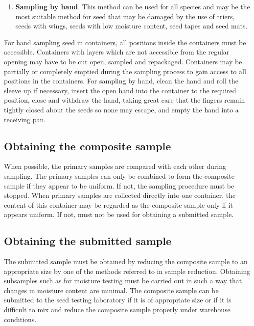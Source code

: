 \documentclass[]{book}
\providecommand{\tightlist}{%
  \setlength{\itemsep}{0pt}\setlength{\parskip}{0pt}}
\begin{document}
\begin{enumerate}
\def\labelenumi{\alph{enumi}.}
\setcounter{enumi}{3}
\tightlist
\item
  \textbf{Sampling by hand}. This method can be used for all species and
  may be the most suitable method for seed that may be damaged by the
  use of triers, seeds with wings, seeds with low moisture content, seed
  tapes and seed mats.
\end{enumerate}

For hand sampling seed in containers, all positions inside the
containers must be accessible. Containers with layers which are not
accessible from the regular opening may have to be cut open, sampled and
repackaged. Containers may be partially or completely emptied during the
sampling process to gain access to all positions in the containers. For
sampling by hand, clean the hand and roll the sleeve up if necessary,
insert the open hand into the container to the required position, close
and withdraw the hand, taking great care that the fingers remain tightly
closed about the seeds so none may escape, and empty the hand into a
receiving pan.

\subsection{Obtaining the composite
sample}\label{obtaining-the-composite-sample}

When possible, the primary samples are compared with each other during
sampling. The primary samples can only be combined to form the composite
sample if they appear to be uniform. If not, the sampling procedure must
be stopped. When primary samples are collected directly into one
container, the content of this container may be regarded as the
composite sample only if it appears uniform. If not, must not be used
for obtaining a submitted sample.

\subsection{Obtaining the submitted
sample}\label{obtaining-the-submitted-sample}

The submitted sample must be obtained by reducing the composite sample
to an appropriate size by one of the methods referred to in sample
reduction. Obtaining subsamples such as for moisture testing must be
carried out in such a way that changes in moisture content are minimal.
The composite sample can be submitted to the seed testing laboratory if
it is of appropriate size or if it is difficult to mix and reduce the
composite sample properly under warehouse conditions.
\end{document}
